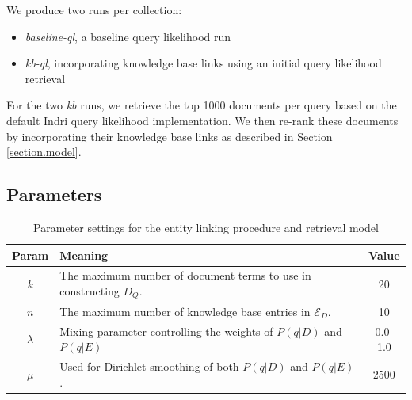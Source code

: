 \documentclass{sig-alternate}
\begin{document}
We produce two runs per collection:
\begin{itemize}
	\item \textit{baseline-ql}, a baseline query likelihood run
	\item \textit{kb-ql}, incorporating knowledge base links using an initial query likelihood retrieval
\end{itemize}

For the two \textit{kb} runs, we retrieve the top 1000 documents per query based on the default Indri query likelihood implementation. We then re-rank these documents by incorporating their knowledge base links as described in Section \ref{section.model}. 

\subsection{Parameters}\label{section.evaluation.parameters}

\begin{table}[htbp]
\centering
\begin{tabular}{|c|p{}|c|} \hline
{\bf Param} & {\bf Meaning} & {\bf Value} \\ \hline
$k$ & The maximum number of document terms to use in constructing $D_Q$. & 20 \\ \hline
$n$ & The maximum number of knowledge base entries in $\mathcal{E}_D$. & 10 \\ \hline
$\lambda$ & Mixing parameter controlling the weights of $P(q|D)$ and $P(q|E)$ & 0.0-1.0 \\ \hline
$\mu$ & Used for Dirichlet smoothing of both $P(q|D)$ and $P(q|E)$. & 2500 \\ \hline
\end{tabular}
\caption{Parameter settings for the entity linking procedure and retrieval model}
\label{table.parameters}
\end{table}
\end{document}
